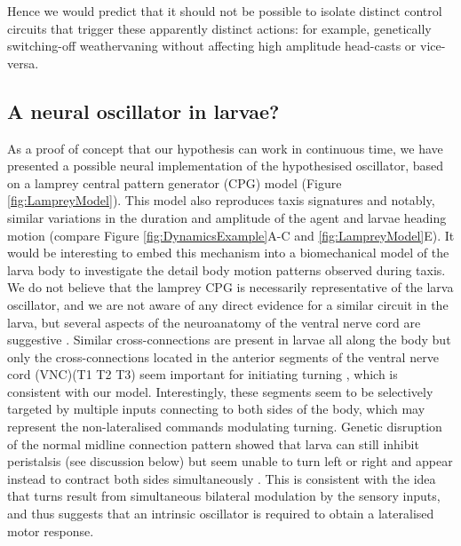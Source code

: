 \documentclass[11pt,a4paper]{article}
\newcommand{\todoBW}[1]{\todo[author=BW,color=orange, size=\tiny,inline]{#1}}
\begin{document}
Hence we would predict that it should not be possible to isolate distinct control circuits that trigger these apparently distinct actions: for example, genetically switching-off weathervaning without affecting high amplitude head-casts or vice-versa.

\subsection{A neural oscillator in larvae?}

As a proof of concept that our hypothesis can work in continuous time, we have presented a possible neural implementation of the hypothesised oscillator, based on a lamprey central pattern generator (CPG) model (Figure \ref{fig:LampreyModel}).
 This model also reproduces taxis signatures and notably, similar variations in the duration and amplitude of the agent and larvae heading motion (compare Figure \ref{fig:DynamicsExample}A-C and \ref{fig:LampreyModel}E). It would be interesting to embed this mechanism into a biomechanical model of the larva body to investigate the detail body motion patterns observed during taxis. 
  We do not believe that the lamprey CPG is necessarily representative of the larva oscillator, and we are not aware of any direct evidence for a similar circuit in the larva, but several aspects of the neuroanatomy of the ventral nerve cord are suggestive \citep{kohsaka2012development}. Similar cross-connections are present in larvae all along the body \citep{rickert2011morphological} but only the cross-connections located in the anterior segments of the ventral nerve cord (VNC)(T1 T2 T3) seem important for initiating turning \citep{ berni2015genetic}, which is consistent with our model. Interestingly, these segments seem to be selectively targeted by multiple inputs connecting to both sides of the body, which may represent the non-lateralised commands modulating turning. Genetic disruption of the normal midline connection pattern showed that larva can still inhibit peristalsis (see discussion below) but seem unable to turn left or right and appear instead to contract both sides simultaneously \citep{berni2015genetic}. This is consistent with the idea that turns result from simultaneous bilateral modulation by the sensory inputs, and thus suggests that an intrinsic oscillator is required to obtain a lateralised motor response.
  
\end{document}
